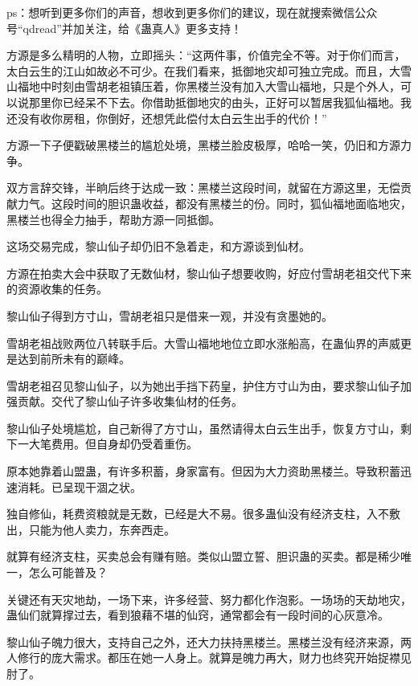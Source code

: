 
\begin{this_body}

ps：想听到更多你们的声音，想收到更多你们的建议，现在就搜索微信公众号“qdread”并加关注，给《蛊真人》更多支持！

方源是多么精明的人物，立即摇头：“这两件事，价值完全不等。对于你们而言，太白云生的江山如故必不可少。在我们看来，抵御地灾却可独立完成。而且，大雪山福地中时刻由雪胡老祖镇压着，你黑楼兰没有加入大雪山福地，只是个外人，可以说那里你已经呆不下去。你借助抵御地灾的由头，正好可以暂居我狐仙福地。我还没有收你房租，你倒好，还想凭此偿付太白云生出手的代价！”

方源一下子便戳破黑楼兰的尴尬处境，黑楼兰脸皮极厚，哈哈一笑，仍旧和方源力争。

双方言辞交锋，半晌后终于达成一致：黑楼兰这段时间，就留在方源这里，无偿贡献力气。这段时间的胆识蛊收益，都没有黑楼兰的份。同时，狐仙福地面临地灾，黑楼兰也得全力抽手，帮助方源一同抵御。

这场交易完成，黎山仙子却仍旧不急着走，和方源谈到仙材。

方源在拍卖大会中获取了无数仙材，黎山仙子想要收购，好应付雪胡老祖交代下来的资源收集的任务。

黎山仙子得到方寸山，雪胡老祖只是借来一观，并没有贪墨她的。

雪胡老祖战败两位八转联手后。大雪山福地地位立即水涨船高，在蛊仙界的声威更是达到前所未有的巅峰。

雪胡老祖召见黎山仙子，以为她出手挡下药皇，护住方寸山为由，要求黎山仙子加强贡献。交代了黎山仙子许多收集仙材的任务。

黎山仙子处境尴尬，自己新得了方寸山，虽然请得太白云生出手，恢复方寸山，剩下一大笔费用。但自身却仍受着重伤。

原本她靠着山盟蛊，有许多积蓄，身家富有。但因为大力资助黑楼兰。导致积蓄迅速消耗。已呈现干涸之状。

独自修仙，耗费资粮就是无数，已经是大不易。很多蛊仙没有经济支柱，入不敷出，只能为他人卖力，东奔西走。

就算有经济支柱，买卖总会有赚有赔。类似山盟立誓、胆识蛊的买卖。都是稀少唯一，怎么可能普及？

关键还有天灾地劫，一场下来，许多经营、努力都化作泡影。一场场的天劫地灾，蛊仙们就算撑过去，看到狼藉不堪的仙窍，通常都会有一段时间的心灰意冷。

黎山仙子魄力很大，支持自己之外，还大力扶持黑楼兰。黑楼兰没有经济来源，两人修行的庞大需求。都压在她一人身上。就算是魄力再大，财力也终究开始捉襟见肘了。


\end{this_body}
